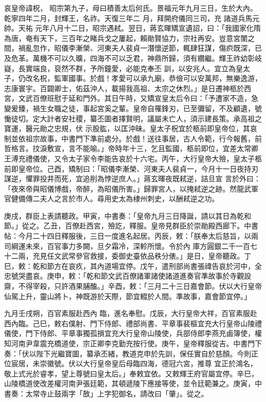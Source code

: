 
\begin{pinyinscope}

 哀皇帝諱柷，
 昭宗第九子，母曰積善太后何氏。景福元年九月三日，生於大內。乾寧四年二月，封輝王，名祚。天復三年二
 月，拜開府儀同三司，充
 諸道兵馬元帥。天祐
 元年八月十二日，昭宗遇弒。翌日，蔣玄暉矯宣遺詔，曰：「我國家化隋為唐，奄有天下，三百年之睹兵戈之屢起，賴勛賢協力，宗社再安。豈意宮闈之間，禍亂忽作，昭儀李漸榮、河東夫人裴貞一潛懷逆節，輒肆狂謀，傷疻既深，已及危革。萬機不可以久曠，四海不可以乏君，神鼎所歸，須有纘繼。輝王祚幼彰岐嶷，長實端良，裒然不群，予所鐘愛，必能克奉丕
 訓，以安兆人。宜立為皇太子，仍改名柷，監軍國事。於戲！孝愛可以承九廟，恭儉可以安萬邦，無樂逸游，志康寰宇。百闢卿士，佑茲沖人，載揚我高祖、太宗之休烈。」是日遷神柩於西宮，文武百僚班慰于延和門外。其日午時，又矯宣皇太后令曰：「予遭家不造，急變爰臻，禍生女職之徒，事起宮奚之輩。皇帝自罹鋒刃，已至彌留，不及顧遺，號慟徒切。定大計者安社稷，纂丕圖者擇賢明，議屬未亡人，須示建長策。承高祖之寶運，醫元勛之忠規，伏
 示股肱，以匡沖昧。皇太子柷宜於柩前即皇帝位，其哀制並依祖宗故事，中書門下準前處分。於戲！送往事居，古人令範，行今報舊，前哲格言。抆淚敷宣，言不能喻。」帝時年十三，乞且監國，柩前即位，宜差太常卿王溥充禮儀使，又令太子家令李能告哀於十六宅。丙午，大行皇帝大殮，皇太子柩前即皇帝位。己酉，矯制曰：「昭儀李漸榮、河東夫人裴貞一，今月十一日夜持刃謀逆，懼罪投井而死，宜追削為悖逆庶人。」蔣玄暉夜既弒逆，詰旦宣
 言於外曰：「夜來帝與昭儀博戲，帝醉，為昭儀所害。」歸罪宮人，以掩弒逆之跡。然龍武軍官健備傳二夫人之言於市人。尋用史太為棣州刺史，以酬弒逆之功。



 庚戌，群臣上表請聽政。甲寅，中書奏：「皇帝九月三日降誕，請以其日為乾和節。」從之。乙丑，百僚赴西宮，殮訖，釋服。皇帝見群臣於崇勛殿西廊下。中書帖：今月二十四日釋服後，三日一度進名起居。丙辰，敕：「朕奉太后慈旨，以兩司綱運未來，百官事力多闕，旦夕霜冷，深軫所懷。令於內
 庫方圓銀二千一百七十二兩，充見任文武常參官救接，委御史臺依品秩分俵。」是日，皇帝聽政。丁巳，敕：乾和節方在哀疚，其內道場宜停。戊午，遣刑部尚書張禕告哀於河中，全忠號哭盡哀。庚申，敕：「乾和節文武百僚諸軍諸使諸道進奏官準故事於寺觀設齋，不得宰殺，只許酒果脯醢。」辛酉，敕：「三月二十三日嘉會節。伏以大行皇帝仙駕上升，靈山將卜，神既游於天際，節宜輟於人間。準故事，嘉會節宜停。」



 九月壬戌朔，百官素服赴西內
 臨，進名奉慰。戊辰，大行皇帝大祥，百官素服赴西內臨。己巳，敕右僕射、門下侍郎、禮部尚書、平章事裴樞宜充大行皇帝山陵禮儀使，門下侍郎、平章事獨孤損宜充大行皇帝山陵使，兵部侍郎李燕充鹵簿使，權知河南尹韋震充橋道使，宗正卿李克勤充按行使。庚午，皇帝釋服從吉。中書門下奏：「伏以陛下光繼寶圖，纂承丕緒，教道克申於先訓，保任實自於慈顏。今則正位宸居，未崇徽號。伏以大行皇帝皇后母臨四海，德冠六宮，推尊
 宜正於鴻名，敬上式光於睿孝，望上尊號曰皇太后。」奉敕宜依。又敕輝王府官屬宜停。辛巳，山陵橋道使改差權河南尹張廷範，其頓遞陵下應接等使，並令廷範兼之。庚寅，中書奏：太常寺止鼓兩字「敔」上字犯御名，請改曰「肇」。從之。




\end{pinyinscope}
